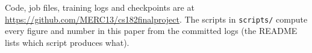 Code, job files, training logs and checkpoints are at \url{https://github.com/MERC13/cs182finalproject}. The scripts in \texttt{scripts/} compute every figure and number in this paper from the committed logs (the README lists which script produces what).
